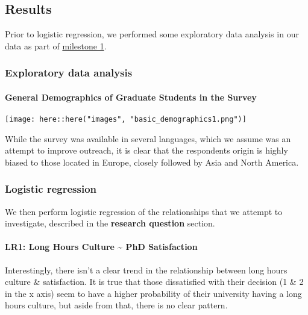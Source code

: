 \documentclass[
]{article}
\begin{document}
\hypertarget{results}{%
\subsection{Results}\label{results}}

Prior to logistic regression, we performed some exploratory data
analysis in our data as part of
\href{https://github.com/STAT547-UBC-2019-20/group05/tree/master/docs/milestone-01}{milestone
1}.

\hypertarget{exploratory-data-analysis}{%
\subsubsection{Exploratory data
analysis}\label{exploratory-data-analysis}}

\hypertarget{general-demographics-of-graduate-students-in-the-survey}{%
\paragraph{General Demographics of Graduate Students in the
Survey}\label{general-demographics-of-graduate-students-in-the-survey}}

\texttt{[image: here::here("images", "basic\_demographics1.png")]}

While the survey was available in several languages, which we assume was
an attempt to improve outreach, it is clear that the respondents origin
is highly biased to those located in Europe, closely followed by Asia
and North America.

\hypertarget{logistic-regression}{%
\subsubsection{Logistic regression}\label{logistic-regression}}

We then perform logistic regression of the relationships that we attempt
to investigate, described in the \textbf{research question} section.

\hypertarget{lr1-long-hours-culture-phd-satisfaction}{%
\paragraph{LR1: Long Hours Culture \textasciitilde{} PhD
Satisfaction}\label{lr1-long-hours-culture-phd-satisfaction}}

Interestingly, there isn't a clear trend in the relationship between
long hours culture \& satisfaction. It is true that those dissatisfied
with their decision (1 \& 2 in the x axis) seem to have a higher
probability of their university having a long hours culture, but aside
from that, there is no clear pattern.
\end{document}
